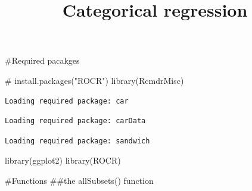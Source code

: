 \documentclass[
  letterpaper,
  DIV=11,
  numbers=noendperiod]{scrartcl}
\title{Categorical regression}
\author{}
\date{}
\newenvironment{Shaded}{\begin{snugshade}}{\end{snugshade}}
\newcommand{\CommentTok}[1]{\textcolor[rgb]{0.37,0.37,0.37}{#1}}
\newcommand{\FunctionTok}[1]{\textcolor[rgb]{0.28,0.35,0.67}{#1}}
\newcommand{\NormalTok}[1]{\textcolor[rgb]{0.00,0.23,0.31}{#1}}
\begin{document}
\maketitle


\#Required pacakges

\begin{Shaded}
\begin{Highlighting}[]
\CommentTok{\# install.packages("ROCR")}
\FunctionTok{library}\NormalTok{(RcmdrMisc)}
\end{Highlighting}
\end{Shaded}

\begin{verbatim}
Loading required package: car
\end{verbatim}

\begin{verbatim}
Loading required package: carData
\end{verbatim}

\begin{verbatim}
Loading required package: sandwich
\end{verbatim}

\begin{Shaded}
\begin{Highlighting}[]
\FunctionTok{library}\NormalTok{(ggplot2)}
\FunctionTok{library}\NormalTok{(ROCR)}
\end{Highlighting}
\end{Shaded}

\#Functions \#\#the allSubsets() function
\end{document}
